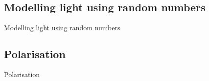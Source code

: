 \documentclass[]{article}
\begin{document}
\begin{frame}
    \section{Modelling light using random numbers}
    \begin{center}
    {\huge \textcolor{solarizedBase3}{
        Modelling light using random numbers
    }}
    \end{center}
\end{frame}

\begin{frame}
    \section{Polarisation}
    \begin{center}
    {\huge \textcolor{solarizedBase3}{
        Polarisation
    }}
    \end{center}
\end{frame}




%
%
\end{document}
